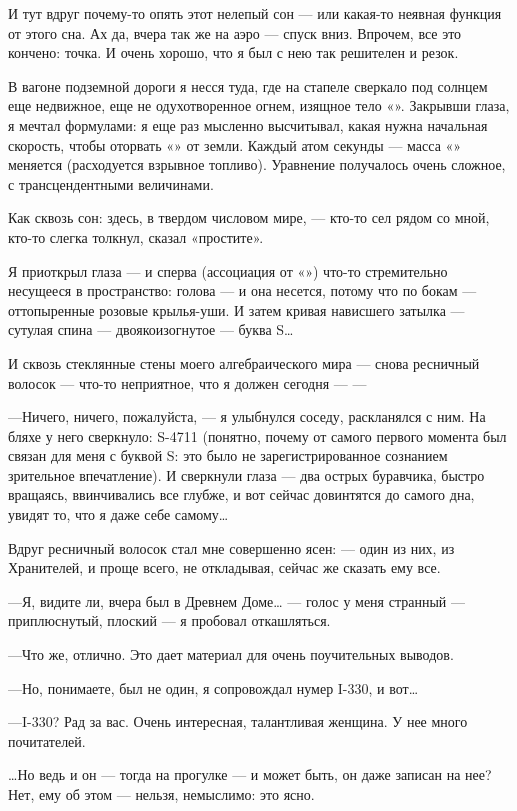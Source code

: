 \documentclass[11pt,openany]{book}
\begin{document}
И тут вдруг почему-то опять этот нелепый сон --- или какая-то неявная функция от этого сна. Ах да, вчера так же на аэро --- спуск вниз. Впрочем, все это кончено: точка. И очень хорошо, что я был с нею так решителен и резок.

В вагоне подземной дороги я несся туда, где на стапеле сверкало под солнцем еще недвижное, еще не одухотворенное огнем, изящное тело «». Закрывши глаза, я мечтал формулами: я еще раз мысленно высчитывал, какая нужна начальная скорость, чтобы оторвать «» от земли. Каждый атом секунды --- масса «» меняется (расходуется взрывное топливо). Уравнение получалось очень сложное, с трансцендентными величинами.

Как сквозь сон: здесь, в твердом числовом мире, --- кто-то сел рядом со мной, кто-то слегка толкнул, сказал «простите».

Я приоткрыл глаза --- и сперва (ассоциация от «») что-то стремительно несущееся в пространство: голова --- и она несется, потому что по бокам --- оттопыренные розовые крылья-уши. И затем кривая нависшего затылка --- сутулая спина --- двоякоизогнутое --- буква S\ldots{}

И сквозь стеклянные стены моего алгебраического мира --- снова ресничный волосок --- что-то неприятное, что я должен сегодня --- ---

---Ничего, ничего, пожалуйста, --- я улыбнулся соседу, раскланялся с ним. На бляхе у него сверкнуло: S-4711 (понятно, почему от самого первого момента был связан для меня с буквой S: это было не зарегистрированное сознанием зрительное впечатление). И сверкнули глаза --- два острых буравчика, быстро вращаясь, ввинчивались все глубже, и вот сейчас довинтятся до самого дна, увидят то, что я даже себе самому\ldots{}

Вдруг ресничный волосок стал мне совершенно ясен: --- один из них, из Хранителей, и проще всего, не откладывая, сейчас же сказать ему все.

---Я, видите ли, вчера был в Древнем Доме\ldots{} --- голос у меня странный --- приплюснутый, плоский --- я пробовал откашляться.

---Что же, отлично. Это дает материал для очень поучительных выводов.

---Но, понимаете, был не один, я сопровождал нумер I-330, и вот\ldots{}

---I-330? Рад за вас. Очень интересная, талантливая женщина. У нее много почитателей.

\ldots{}Но ведь и он --- тогда на прогулке --- и может быть, он даже записан на нее? Нет, ему об этом --- нельзя, немыслимо: это ясно.
\end{document}
